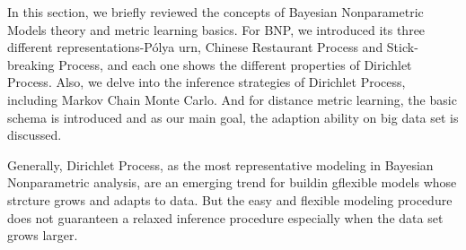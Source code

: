 	In this section, we briefly reviewed the concepts of Bayesian Nonparametric Models theory and metric learning basics. For BNP, we introduced its three different representations-P\'{o}lya urn, Chinese Restaurant Process and Stick-breaking Process, and each one shows the different properties of Dirichlet Process. Also, we delve into the inference strategies of Dirichlet Process, including Markov Chain Monte Carlo. 
	And for distance metric learning, the basic schema is introduced and as our main goal, the adaption ability on big data set is discussed.
   
    Generally, Dirichlet Process, as the most representative modeling in Bayesian Nonparametric analysis, are an emerging trend for buildin gflexible models whose strcture grows and adapts to data. But the easy and flexible modeling procedure does not guaranteen a relaxed inference procedure especially when the data set grows larger.   